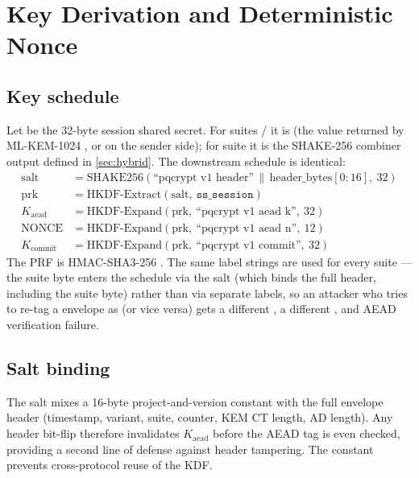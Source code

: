 \section{Key Derivation and Deterministic Nonce}
\label{sec:kdf-nonce}

\subsection{Key schedule}

Let  be the 32-byte session shared secret. For suites / it is  (the value returned by ML-KEM-1024 , or  on the sender side); for suite  it is the SHAKE-256 combiner output defined in \cref{sec:hybrid}. The downstream schedule is identical:
\begin{align*}
\mathrm{salt} &= \mathrm{SHAKE256}(\text{``pqcrypt v1 header''} \,\|\, \mathrm{header\_bytes}[0\!:\!16],\ 32) \\
\mathrm{prk}  &= \mathrm{HKDF\text{-}Extract}(\mathrm{salt},\ \texttt{ss\_session}) \\
K_{\mathrm{aead}}   &= \mathrm{HKDF\text{-}Expand}(\mathrm{prk},\ \text{``pqcrypt v1 aead k''},\ 32) \\
\mathrm{NONCE}      &= \mathrm{HKDF\text{-}Expand}(\mathrm{prk},\ \text{``pqcrypt v1 aead n''},\ 12) \\
K_{\mathrm{commit}} &= \mathrm{HKDF\text{-}Expand}(\mathrm{prk},\ \text{``pqcrypt v1 commit''},\ 32)
\end{align*}
The PRF is HMAC-SHA3-256 \citep{fips202}. The same label strings are used for every suite --- the suite byte enters the schedule via the salt (which binds the full header, including the suite byte) rather than via separate labels, so an attacker who tries to re-tag a  envelope as  (or vice versa) gets a different , a different , and AEAD verification failure.

\subsection{Salt binding}

The salt mixes a 16-byte project-and-version constant with the full envelope header (timestamp, variant, suite, counter, KEM CT length, AD length). Any header bit-flip therefore invalidates $K_{\mathrm{aead}}$ before the AEAD tag is even checked, providing a second line of defense against header tampering. The constant prevents cross-protocol reuse of the KDF.

